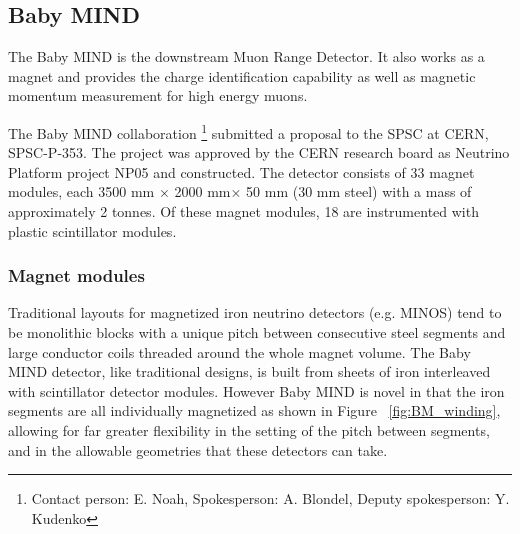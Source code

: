 \subsection{Baby MIND}
The Baby MIND is the downstream Muon Range Detector.
It also works as a magnet and provides the charge identification capability
as well as magnetic momentum measurement for high energy muons.

The Baby MIND collaboration \footnote{Contact person: E. Noah, Spokesperson: A. Blondel, Deputy spokesperson: Y. Kudenko} submitted a proposal to the SPSC at CERN, SPSC-P-353.
The project was approved by the CERN research board as Neutrino Platform project NP05 and constructed.
The detector consists of 33 magnet modules, each 3500 mm $\times$ 2000 mm$ \times$ 50 mm (30 mm steel) with a mass of approximately 2 tonnes. Of these magnet modules, 18 are instrumented with plastic scintillator modules. 




\subsubsection{Magnet modules}
Traditional layouts for magnetized iron neutrino detectors (e.g. MINOS) tend to be monolithic blocks
with a unique pitch between consecutive steel segments and large conductor coils threaded around the whole magnet volume.
The Baby MIND detector, like traditional designs, is built from sheets of iron interleaved with scintillator detector modules.
However Baby MIND is novel in that the iron segments are all individually magnetized as shown in Figure ~\ref{fig:BM_winding}, allowing for far greater flexibility in the setting of the pitch between segments, and in the allowable geometries that these detectors can take.


